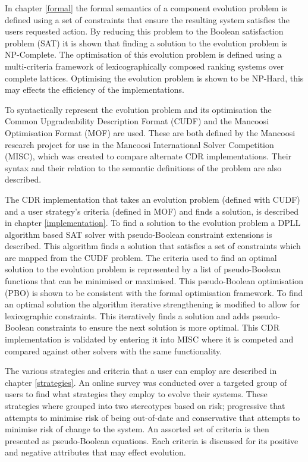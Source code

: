 In chapter \ref{formal} the formal semantics of a component evolution problem is defined using a set of constraints that ensure the resulting system satisfies the users requested action.
By reducing this problem to the Boolean satisfaction problem (SAT) it is shown that finding a solution to the evolution problem is NP-Complete.
The optimisation of this evolution problem is defined using a multi-criteria framework of lexicographically composed ranking systems over complete lattices.
Optimising the evolution problem is shown to be NP-Hard, this may effects the efficiency of the implementations.

To syntactically represent the evolution problem and its optimisation the Common Upgradeability Description Format (CUDF) and the Mancoosi Optimisation Format (MOF) are used.
These are both defined by the Mancoosi research project for use in the Mancoosi International Solver Competition (MISC), 
which was created to compare alternate CDR implementations.
Their syntax and their relation to the semantic definitions of the problem are also described.

The CDR implementation that takes an evolution problem (defined with CUDF) and a user strategy's criteria (defined in MOF) and finds a solution, is described in chapter \ref{implementation}.
To find a solution to the evolution problem a DPLL algorithm based SAT solver with pseudo-Boolean constraint extensions is described.
This algorithm finds a solution that satisfies a set of constraints which are mapped from the CUDF problem.
The criteria used to find an optimal solution to the evolution problem is represented by a list of pseudo-Boolean functions that can be minimised or maximised.
This pseudo-Boolean optimisation (PBO) is shown to be consistent with the formal optimisation framework.
To find an optimal solution the algorithm iterative strengthening is modified to allow for lexicographic constraints.
This iteratively finds a solution and adds pseudo-Boolean constraints to ensure the next solution is more optimal.
This CDR implementation is validated by entering it into MISC where it is competed and compared against other solvers with the same functionality.

The various strategies and criteria that a user can employ are described in chapter \ref{strategies}.
An online survey was conducted over a targeted group of users to find what strategies they employ to evolve their systems.
These strategies where grouped into two stereotypes based on risk;
progressive that attempts to minimise risk of being out-of-date
and conservative that attempts to minimise risk of change to the system.
An assorted set of criteria is then presented as pseudo-Boolean equations.
Each criteria is discussed for its positive and negative attributes that may effect evolution.

